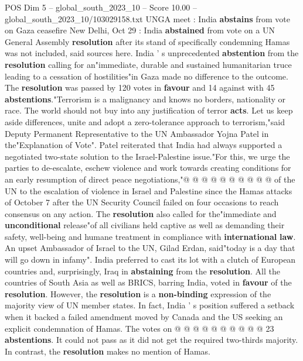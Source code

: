\begin{textsample}{POS Dim 5 – global\_south\_2023\_10 – Score 10.00 – global\_south\_2023\_10/103029158.txt}  \label{ex:f5_pos_370}
UNGA meet : India \textbf{abstains} from vote on Gaza ceasefire New Delhi, Oct 29 : India \textbf{abstained} from vote on a UN General Assembly \textbf{resolution} after its stand of specifically condemning Hamas was not included, said sources here.
India ' s unprecedented \textbf{abstention} from the \textbf{resolution} calling for an"immediate, durable and sustained humanitarian truce leading to a cessation of hostilities"in Gaza made no difference to the outcome.
The \textbf{resolution} was passed by 120 votes in \textbf{favour} and 14 against with 45 \textbf{abstentions}."Terrorism is a malignancy and knows no borders, nationality or race.
The world should not buy into any justification of terror \textbf{acts}.
Let us keep aside differences, unite and adopt a zero-tolerance approach to terrorism,"said Deputy Permanent Representative to the UN Ambassador Yojna Patel in the"Explanation of Vote".
Patel reiterated that India had always supported a negotiated two-state solution to the Israel-Palestine issue."For this, we urge the parties to de-escalate, eschew violence and work towards creating conditions for an early resumption of direct peace negotiations,"@ @ @ @ @ @ @ @ @ @ of the UN to the escalation of violence in Israel and Palestine since the Hamas attacks of October 7 after the UN Security Council failed on four occasions to reach consensus on any action.
The \textbf{resolution} also called for the"immediate and \textbf{unconditional} release"of all civilians held captive as well as demanding their safety, well-being and humane treatment in compliance with \textbf{international} \textbf{law}.
An upset Ambassador of Israel to the UN, Gilad Erdan, said"today is a day that will go down in infamy".
India preferred to cast its lot with a clutch of European countries and, surprisingly, Iraq in \textbf{abstaining} from the \textbf{resolution}.
All the countries of South Asia as well as BRICS, barring India, voted in \textbf{favour} of the \textbf{resolution}.
However, the \textbf{resolution} is a \textbf{non-binding} expression of the majority view of UN member states.
In fact, India ' s position suffered a setback when it backed a failed amendment moved by Canada and the US seeking an explicit condemnation of Hamas.
The votes on @ @ @ @ @ @ @ @ @ @ 23 \textbf{abstentions}.
It could not pass as it did not get the required two-thirds majority.
In contrast, the \textbf{resolution} makes no mention of Hamas.

\end{textsample}

